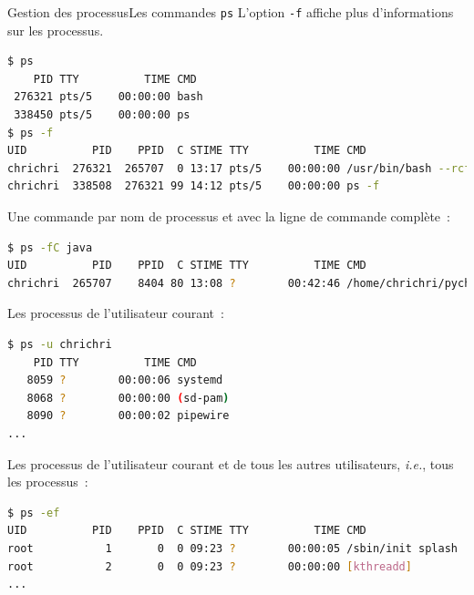\documentclass{beamer}
\begin{document}
    \begin{frame}[fragile]{Gestion des processus}{Les commandes \lstinline{ps}}
        L'option \lstinline{-f} affiche plus d'informations sur les processus.
        \begin{lstlisting}[language=bash,basicstyle=\tiny\ttfamily]
$ ps
    PID TTY          TIME CMD
 276321 pts/5    00:00:00 bash
 338450 pts/5    00:00:00 ps
$ ps -f
UID          PID    PPID  C STIME TTY          TIME CMD
chrichri  276321  265707  0 13:17 pts/5    00:00:00 /usr/bin/bash --rcfile /home/chrichri/pycharm-professional-2024.1.4/pycharm-2024.1.4/plugins/terminal/shell-integrations/bash/bash-integration.bash -i
chrichri  338508  276321 99 14:12 pts/5    00:00:00 ps -f
        \end{lstlisting}
        Une commande par nom de processus et avec la ligne de commande complète~:
        \begin{lstlisting}[language=bash,basicstyle=\tiny\ttfamily]
$ ps -fC java
UID          PID    PPID  C STIME TTY          TIME CMD
chrichri  265707    8404 80 13:08 ?        00:42:46 /home/chrichri/pycharm...
        \end{lstlisting}
        \bigbreak
        Les processus de l'utilisateur courant~:
        \begin{lstlisting}[language=bash,basicstyle=\tiny\ttfamily]
$ ps -u chrichri
    PID TTY          TIME CMD
   8059 ?        00:00:06 systemd
   8068 ?        00:00:00 (sd-pam)
   8090 ?        00:00:02 pipewire
...
        \end{lstlisting}
        \bigbreak
        Les processus de l'utilisateur courant et de tous les autres utilisateurs, \textit{i.e.}, tous les processus~:
        \begin{lstlisting}[language=bash,basicstyle=\tiny\ttfamily]
$ ps -ef
UID          PID    PPID  C STIME TTY          TIME CMD
root           1       0  0 09:23 ?        00:00:05 /sbin/init splash
root           2       0  0 09:23 ?        00:00:00 [kthreadd]
...
        \end{lstlisting}
    \end{frame}
\end{document}
